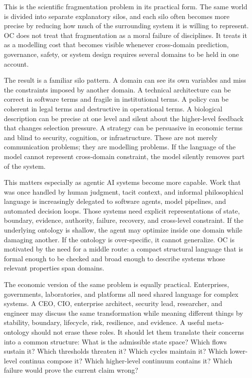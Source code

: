 This is the scientific fragmentation problem in its practical form. The same
world is divided into separate explanatory silos, and each silo often becomes
more precise by reducing how much of the surrounding system it is willing to
represent. OC does not treat that fragmentation as a moral failure of
disciplines. It treats it as a modelling cost that becomes visible whenever
cross-domain prediction, governance, safety, or system design requires several
domains to be held in one account.

The result is a familiar silo pattern. A domain can see its own variables and
miss the constraints imposed by another domain. A technical architecture can be
correct in software terms and fragile in institutional terms. A policy can be
coherent in legal terms and destructive in operational terms. A biological
description can be precise at one level and silent about the higher-level
feedback that changes selection pressure. A strategy can be persuasive in
economic terms and blind to security, cognition, or infrastructure. These are
not merely communication problems; they are modelling problems. If the language
of the model cannot represent cross-domain constraint, the model silently
removes part of the system.

This matters especially as agentic AI systems become more capable. Work that
was once handled by human judgment, tacit context, and informal philosophical
language is increasingly delegated to software agents, model pipelines, and
automated decision loops. Those systems need explicit representations of
state, boundary, evidence, authority, failure, recovery, and cross-level
constraint. If the underlying ontology is shallow, the agent may optimize inside
one domain while damaging another. If the ontology is over-specific, it cannot
generalize. OC is motivated by the need for a middle route: a compact structural
language that is formal enough to be checked and broad enough to describe
systems whose relevant properties span domains.

The economic version of the same problem is equally practical. Enterprises,
governments, laboratories, and platforms all need shared language for complex
systems. A CEO, CIO, enterprise architect, security lead, researcher, and
engineer may discuss the same transformation while meaning different things by
stability, boundary, lifecycle, risk, resilience, and evidence. A useful
meta-ontology should not erase these roles. It should let them translate their
concerns into a common structure: What is the admissible state space? Which
flows sustain it? Which thresholds threaten it? Which cycles maintain it? Which
lower-level continua compose it? Which higher-level continuum contains it?
Which failure would prove the current claim wrong?

